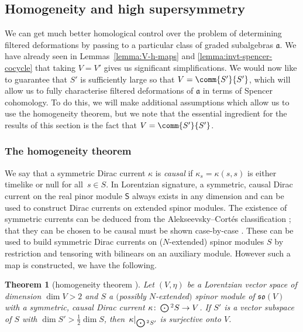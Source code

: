 \documentclass[10pt,a4paper]{amsart}
\numberwithin{equation}{section}
\newtheorem{Theorem}{Theorem}[section]
\newcommand{\fa}{\mathfrak{a}}
\newcommand{\fso}{\mathfrak{so}}
\newcommand{\ssS}{\mathsf{S}}
\newcommand{\Odot}{\mathchoice{{\textstyle\bigodot}}{\bigodot}{\bigodot}{\bigodot}}
\newcommand{\1}{\mathbbm{1}}
\begin{document}
\subsection{Homogeneity and high supersymmetry}
\label{sec:homogeneity}

We can get much better homological control over the problem of determining filtered deformations by passing to a particular class of graded subalgebras $\fa$. We have already seen in Lemmas~\ref{lemma:V-h-maps} and \ref{lemma:invt-spencer-cocycle} that taking $V=V'$ gives us significant simplifications. We would now like to guarantee that $S'$ is sufficiently large so that $V=\comm{S'}{S'}$, which will allow us to fully characterise filtered deformations of $\fa$ in terms of Spencer cohomology. To do this, we will make additional assumptions which allow us to use the homogeneity theorem, but we note that the essential ingredient for the results of this section is the fact that $V=\comm{S'}{S'}$.

\subsubsection{The homogeneity theorem}

We say that a symmetric Dirac current $\kappa$ is \emph{causal} if $\kappa_s=\kappa(s,s)$ is either timelike or null for all~${s\in S}$. In Lorentzian signature, a symmetric, causal Dirac current on the real pinor module $\ssS$ always exists in any dimension and can be used to construct Dirac currents on extended spinor modules. The existence of symmetric currents can be deduced from the Alekseevsky--Cort\'es classification \cite{Alekseevsky1997}; that they can be chosen to be causal must be shown case-by-case \cite{Hustler2016}. These can be used to build symmetric Dirac currents on ($N$-extended) spinor modules $S$ by restriction and tensoring with bilinears on an auxiliary module. However such a map is constructed, we have the following.

\begin{Theorem}[homogeneity theorem \cite{Figueroa-OFarrill2012,Hustler2016}]\label{thm:homogeneity}
	Let $(V,\eta)$ be a Lorentzian vector space of dimension $\dim V>2$ and $S$ a $($possibly $N$-extended$)$ spinor module of $\fso(V)$ with a symmetric, causal Dirac current $\kappa\colon \Odot^2 S \to V$. If $S'$ is a vector subspace of $S$ with $\dim S'>\frac{1}{2}\dim S$, then~${\kappa|_{\Odot^2S'}}$ is surjective onto $V$.
\end{Theorem}
\end{document}
